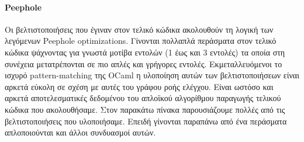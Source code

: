 \documentclass[12pt]{article}
\begin{document}
\paragraph{Peephole} Οι βελτιστοποιήσεις που έγιναν στον τελικό κώδικα ακολουθούν τη λογική των λεγόμενων Peephole optimizations. Γίνονται πολλαπλά περάσματα στον τελικό κώδικα ψάχνοντας για γνωστά μοτίβα εντολών (1 έως και 3 εντολές) τα οποία στη συνέχεια μετατρέπονται σε πιο απλές και γρήγορες εντολές. Εκμεταλλευόμενοι το ισχυρό pattern-matching της OCaml η υλοποίηση αυτών των βελτιστοποιήσεων είναι αρκετά εύκολη σε σχέση με αυτές του γράφου ροής ελέγχου. Είναι ωστόσο και αρκετά αποτελεσματικές δεδομένου του απλοϊκού αλγορίθμου παραγωγής τελικού κώδικα που ακολουθήσαμε. Στον παρακάτω πίνακα παρουσιάζουμε πολλές από τις βελτιστοποιήσεις που υλοποιήσαμε. Επειδή γίνονται παραπάνω από ένα περάσματα απλοποιούνται και άλλοι συνδυασμοί αυτών.
\end{document}
